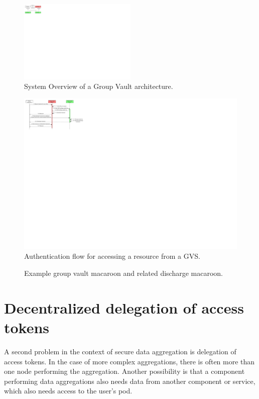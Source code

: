 \begin{figure}[h]
    \centering
    \includegraphics[width=0.50\textwidth]{images/macaroons-solid/ComponentDiagram-Group-Vault-System-Overview.pdf}
    \caption{System Overview of a Group Vault architecture.}
    \label{fig:gv-sys-overview}
\end{figure}

\begin{figure}[h]
    \centering
    \includegraphics[width=1.0\textwidth]{images/macaroons-solid/InteractionDiagram-Group-Vault-Authentication-Flow.pdf}
    \caption{Authentication flow for accessing a resource from a \acrlong{GVS}.}
    \label{fig:gv-macaroon-flow}
\end{figure}

\begin{figure}[H]
    \centering
    
    \caption{Example group vault macaroon and related discharge macaroon.}
    \label{fig:gv-macaroon-example}
\end{figure}

\section{Decentralized delegation of access tokens}
\label{sec:decentralized-delegation}
A second problem in the context of secure data aggregation is delegation of access tokens. In the case of more complex aggregations, there is often more than one node performing the aggregation. Another possibility is that a component performing data aggregations also needs data from another component or service, which also needs access to the user's pod. 


